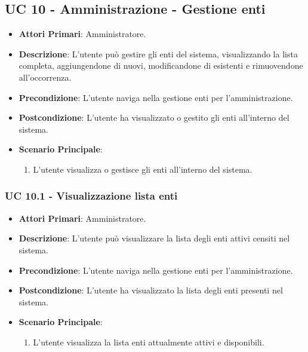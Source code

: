 \subsection{UC 10 - Amministrazione - Gestione enti}

		\begin{itemize}
			\item \textbf{Attori Primari}: Amministratore.
			\item \textbf{Descrizione}: L'utente può gestire gli enti del sistema, visualizzando la lista completa, aggiungendone di nuovi, modificandone di esistenti e rimuovendone all'occorrenza.
			\item \textbf{Precondizione}: L'utente naviga nella gestione enti per l'amministrazione.
			\item \textbf{Postcondizione}: L'utente ha visualizzato o gestito gli enti all'interno del sistema. 
			\item \textbf{Scenario Principale}:
			\begin{enumerate}
				\item{L'utente visualizza o gestisce gli enti all'interno del sistema.}
			\end{enumerate}	
		\end{itemize}

			\subsubsection{UC 10.1 - Visualizzazione lista enti }
			\begin{itemize}
				\item \textbf{Attori Primari}: Amministratore.
				\item \textbf{Descrizione}: L'utente può visualizzare la lista degli enti attivi censiti nel sistema.
				\item \textbf{Precondizione}: L'utente naviga nella gestione enti per l'amministrazione.
				\item \textbf{Postcondizione}: L'utente ha visualizzato la lista degli enti presenti nel sistema.
				\item \textbf{Scenario Principale}:
				\begin{enumerate}
					\item{L'utente visualizza la lista enti attualmente attivi e disponibili.}
				\end{enumerate}	
			\end{itemize}

